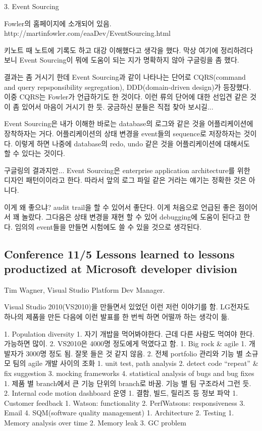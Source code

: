 \documentclass[a4paper]{article}
\begin{document}
3. Event Sourcing
 
Fowler의 홈페이지에 소개되어 있음.
http://martinfowler.com/eaaDev/EventSourcing.html
 
키노트 때 노트에 기록도 하고 대강 이해했다고 생각을 했다. 막상 여기에 정리하려다 보니 Event Sourcing이 뭐에 도움이 되는 지가 명확하지 않아 구글링을 좀 했다.
 
결과는 좀 거시기 한데 Event Sourcing과 같이 나타나는 단어로 CQRS(command and query repsponsibility segregation),  DDD(domain-driven design)가 등장했다. 이중 CQRS는 Fowler가 언급하기도 한 것이다. 이런 류의 단어에 대한 선입견 같은 것이 좀 있어서 마음이 거시기 한 듯. 궁금하신 분들은 직접 찾아 보시길...
 
Event Sourcing은 내가 이해한 바로는 database의 로그와 같은 것을 어플리케이션에 장착하자는  거다. 어플리케이션의 상태 변경을 event들의  sequence로 저장하자는 것이다. 이렇게 하면 나중에 database의 redo, undo 같은 것을 어플리케이션에 대해서도 할 수 있다는 것이다.
 
구글링의 결과지만... Event Sourcing은 enterprise application architecture를 위한 디자인 패턴이이라고 한다. 따라서 앞의 로그 파일 같은 거라는 얘기는 정확한 것은 아니다.
 
이게 왜 좋으냐? audit trail을 할 수 있어서 좋단다. 이게 처음으로 언급된 좋은 점이어서 꽤 놀랐다. 그다음은 상태 변경을 재현 할 수 있어  debugging에 도움이 된다고 한다.  임의의 event들을 만들면 시험에도 쓸 수 있을 것으로 생각된다.

\subsection{Conference 11/5 Lessons learned to lessons productized at Microsoft developer division}
 
Tim Wagner, Visual Studio Platform Dev Manager.
 
Visual Studio 2010(VS2010)을 만들면서 있었던 이런 저런 이야기를 함. LG전자도 하나의 제품을 만든 다음에 이런 발표를 한 번씩 하면 어떨까 하는 생각이 듦.
 
1. Population diversity
1. 자기 개밥을 먹어봐야한다. 근데 다른 사람도 먹여야 한다. 가능하면 많이.
2. VS2010은 4000명 정도에게 먹였다고 함.
1. Big rock \& agile
1. 개발자가 3000명 정도 됨. 잘못 들은 것 같지 않음.
2. 전체 portfolio 관리와 기능 별 소규모 팀의 agile 개발 사이의 조화
1. unit test, path analysis
2. detect code “repeat” \& fix suggestion
3. mocking frameworks
4. statistical analysis of bugs and bug fixes
1. 제품 별 branch에서 큰 기능 단위의 branch로 바꿈.  기능 별 팀 구조라서 그런 듯.
2. Internal code motion dashboard 운영
1. 결함, 빌드, 릴리즈 등 정보 파악
1. Customer feedback
1. Watson: functionality
2. PerfWatsons: responsiveness
3. Email
4. SQM(software quality management)
1. Architecture
2. Testing
1. Memory analysis over time
2. Memory leak
3. GC problem
 
\end{document}
